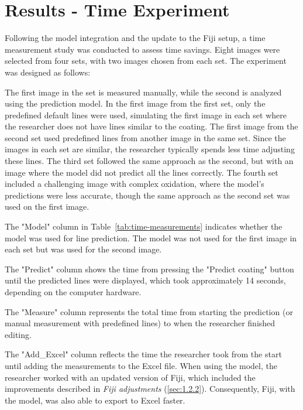 \section{Results - Time Experiment}\label{sec:res}

Following the model integration and the update to the Fiji setup, a time measurement study was conducted to assess time savings. Eight images were selected from four sets, with two images chosen from each set. The experiment was designed as follows:

The first image in the set is measured manually, while the second is analyzed using the prediction model. In the first image from the first set, only the predefined default lines were used, simulating the first image in each set where the researcher does not have lines similar to the coating. The first image from the second set used predefined lines from another image in the same set. Since the images in each set are similar, the researcher typically spends less time adjusting these lines. The third set followed the same approach as the second, but with an image where the model did not predict all the lines correctly. The fourth set included a challenging image with complex oxidation, where the model's predictions were less accurate, though the same approach as the second set was used on the first image.

The "Model" column in Table~\ref{tab:time-measurements} indicates whether the model was used for line prediction. The model was not used for the first image in each set but was used for the second image.

The "Predict" column shows the time from pressing the "Predict coating" button until the predicted lines were displayed, which took approximately 14 seconds, depending on the computer hardware. 

The "Measure" column represents the total time from starting the prediction (or manual measurement with predefined lines) to when the researcher finished editing. 

The "Add\_Excel" column reflects the time the researcher took from the start until adding the measurements to the Excel file. When using the model, the researcher worked with an updated version of Fiji, which included the improvements described in \textit{Fiji adjustments} (\ref{sec:1.2.2}). Consequently, Fiji, with the model, was also able to export to Excel faster.


